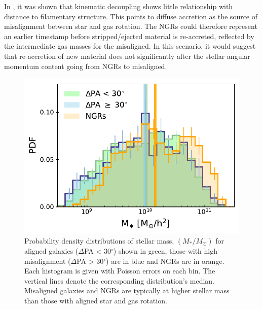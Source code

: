 \documentclass[fleqn,usenatbib]{mnras}
\begin{document}
In \citet{duckworth2019}, it was shown that kinematic decoupling shows little relationship with distance to filamentary structure. This points to diffuse accretion as the source of misalignment between star and gas rotation. The NGRs could therefore represent an earlier timestamp before stripped/ejected material is re-accreted, reflected by the intermediate gas masses for the misaligned. In this scenario, it would suggest that re-accretion of new material does not significantly alter the stellar angular momentum content going from NGRs to misaligned.

\begin{figure}
	\includegraphics[width=\linewidth]{total_pop/delPA_stelM.pdf}
    \caption{Probability density distributions of stellar mass, $(M_{\ast}/M_{\odot})$ for aligned galaxies ($\Delta$PA < 30$^{\circ}$) shown in green, those with high misalignment ($\Delta$PA > 30$^{\circ}$) are in blue and NGRs are in orange. Each histogram is given with Poisson errors on each bin. The vertical lines denote the corresponding distribution's median. Misaligned galaxies and NGRs are typically at higher stellar mass than those with aligned star and gas rotation.}
    \label{fig:delPA_stelM}
\end{figure}
\end{document}
